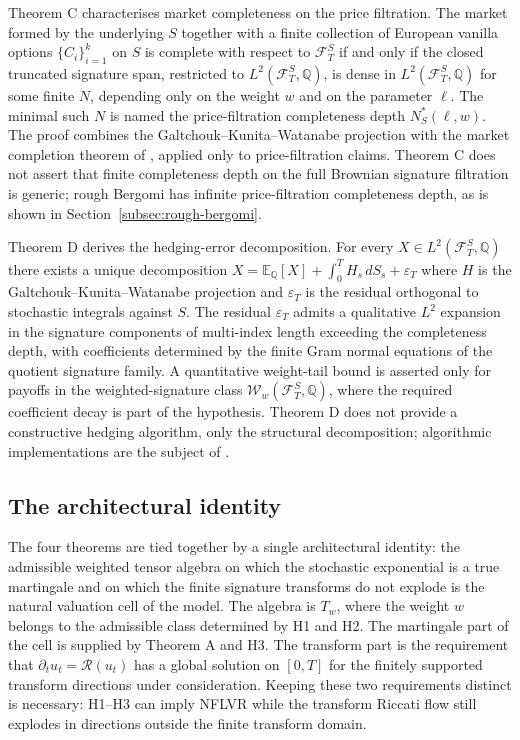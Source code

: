 \documentclass[11pt,oneside]{article}
\theoremstyle{plain}
\theoremstyle{definition}
\theoremstyle{remark}
\newcommand{\E}{\mathbb{E}}
\newcommand{\Q}{\mathbb{Q}}
\newcommand{\Tw}{T_w}
\newcommand{\FS}{\mathcal F^S}
\newcommand{\Rs}{\mathcal R}
\begin{document}
Theorem C characterises market completeness on the price filtration. The market formed by the underlying $S$ together with a finite collection of European vanilla options $\{C_i\}_{i=1}^k$ on $S$ is complete with respect to $\FS_T$ if and only if the closed truncated signature span, restricted to $L^2(\FS_T,\Q)$, is dense in $L^2(\FS_T,\Q)$ for some finite $N$, depending only on the weight $w$ and on the parameter $\ell$. The minimal such $N$ is named the price-filtration completeness depth $N^\ast_S(\ell,w)$. The proof combines the Galtchouk--Kunita--Watanabe projection with the market completion theorem of \citet{DavisObloj2008}, applied only to price-filtration claims. Theorem C does not assert that finite completeness depth on the full Brownian signature filtration is generic; rough Bergomi has infinite price-filtration completeness depth, as is shown in Section~\ref{subsec:rough-bergomi}.

Theorem D derives the hedging-error decomposition. For every $X\in L^2(\FS_T,\Q)$ there exists a unique decomposition $X=\E_\Q[X]+\int_0^T H_s\,dS_s+\varepsilon_T$ where $H$ is the Galtchouk--Kunita--Watanabe projection and $\varepsilon_T$ is the residual orthogonal to stochastic integrals against $S$. The residual $\varepsilon_T$ admits a qualitative $L^2$ expansion in the signature components of multi-index length exceeding the completeness depth, with coefficients determined by the finite Gram normal equations of the quotient signature family. A quantitative weight-tail bound is asserted only for payoffs in the weighted-signature class $\mathcal W_w(\FS_T,\Q)$, where the required coefficient decay is part of the hypothesis. Theorem D does not provide a constructive hedging algorithm, only the structural decomposition; algorithmic implementations are the subject of \citet{AbiJaberGerard2025}.

\subsection{The architectural identity}

The four theorems are tied together by a single architectural identity: the admissible weighted tensor algebra on which the stochastic exponential is a true martingale and on which the finite signature transforms do not explode is the natural valuation cell of the model. The algebra is $\Tw$, where the weight $w$ belongs to the admissible class determined by H1 and H2. The martingale part of the cell is supplied by Theorem A and H3. The transform part is the requirement that $\partial_t u_t=\Rs(u_t)$ has a global solution on $[0,T]$ for the finitely supported transform directions under consideration. Keeping these two requirements distinct is necessary: H1--H3 can imply NFLVR while the transform Riccati flow still explodes in directions outside the finite transform domain.
\end{document}
